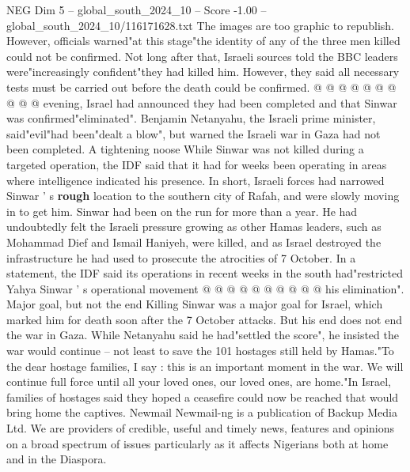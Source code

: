 \begin{textsample}{NEG Dim 5 – global\_south\_2024\_10 – Score -1.00 – global\_south\_2024\_10/116171628.txt}
The images are too graphic to republish.
However, officials warned"at this stage"the identity of any of the three men killed could not be confirmed.
Not long after that, Israeli sources told the BBC leaders were"increasingly confident"they had killed him.
However, they said all necessary tests must be carried out before the death could be confirmed. @ @ @ @ @ @ @ @ @ @ evening, Israel had announced they had been completed and that Sinwar was confirmed"eliminated".
Benjamin Netanyahu, the Israeli prime minister, said"evil"had been"dealt a blow", but warned the Israeli war in Gaza had not been completed.
A tightening noose While Sinwar was not killed during a targeted operation, the IDF said that it had for weeks been operating in areas where intelligence indicated his presence.
In short, Israeli forces had narrowed Sinwar ' s \textbf{rough} location to the southern city of Rafah, and were slowly moving in to get him.
Sinwar had been on the run for more than a year.
He had undoubtedly felt the Israeli pressure growing as other Hamas leaders, such as Mohammad Dief and Ismail Haniyeh, were killed, and as Israel destroyed the infrastructure he had used to prosecute the atrocities of 7 October.
In a statement, the IDF said its operations in recent weeks in the south had"restricted Yahya Sinwar ' s operational movement @ @ @ @ @ @ @ @ @ @ his elimination".
Major goal, but not the end Killing Sinwar was a major goal for Israel, which marked him for death soon after the 7 October attacks.
But his end does not end the war in Gaza.
While Netanyahu said he had"settled the score", he insisted the war would continue -- not least to save the 101 hostages still held by Hamas."To the dear hostage families, I say : this is an important moment in the war.
We will continue full force until all your loved ones, our loved ones, are home."In Israel, families of hostages said they hoped a ceasefire could now be reached that would bring home the captives.
Newmail Newmail-ng is a publication of Backup Media Ltd.
We are providers of credible, useful and timely news, features and opinions on a broad spectrum of issues particularly as it affects Nigerians both at home and in the Diaspora.

\end{textsample}
